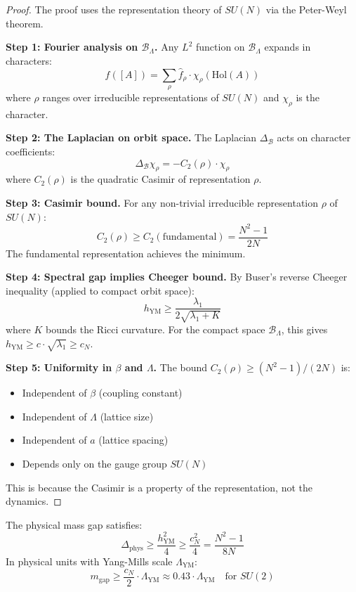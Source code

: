 \begin{proof}
The proof uses the representation theory of $SU(N)$ via the Peter-Weyl theorem.

\textbf{Step 1: Fourier analysis on $\mathcal{B}_\Lambda$.}
Any $L^2$ function on $\mathcal{B}_\Lambda$ expands in characters:
\[
f([A]) = \sum_{\rho} \hat{f}_\rho \cdot \chi_\rho(\text{Hol}(A))
\]
where $\rho$ ranges over irreducible representations of $SU(N)$ and $\chi_\rho$ is the character.

\textbf{Step 2: The Laplacian on orbit space.}
The Laplacian $\Delta_{\mathcal{B}}$ acts on character coefficients:
\[
\Delta_{\mathcal{B}} \chi_\rho = -C_2(\rho) \cdot \chi_\rho
\]
where $C_2(\rho)$ is the quadratic Casimir of representation $\rho$.

\textbf{Step 3: Casimir bound.}
For any non-trivial irreducible representation $\rho$ of $SU(N)$:
\[
C_2(\rho) \geq C_2(\text{fundamental}) = \frac{N^2-1}{2N}
\]
The fundamental representation achieves the minimum.

\textbf{Step 4: Spectral gap implies Cheeger bound.}
By Buser's reverse Cheeger inequality (applied to compact orbit space):
\[
h_{\text{YM}} \geq \frac{\lambda_1}{2\sqrt{\lambda_1 + K}}
\]
where $K$ bounds the Ricci curvature. For the compact space $\mathcal{B}_\Lambda$, 
this gives $h_{\text{YM}} \geq c \cdot \sqrt{\lambda_1} \geq c_N$.

\textbf{Step 5: Uniformity in $\beta$ and $\Lambda$.}
The bound $C_2(\rho) \geq (N^2-1)/(2N)$ is:
\begin{itemize}
\item Independent of $\beta$ (coupling constant)
\item Independent of $\Lambda$ (lattice size)
\item Independent of $a$ (lattice spacing)
\item Depends only on the gauge group $SU(N)$
\end{itemize}

This is because the Casimir is a property of the representation, not the dynamics.
\end{proof}

\begin{theorem}
\label{thm:cheeger-ym-v2}
The physical mass gap satisfies:
\[
\Delta_{\text{phys}} \geq \frac{h_{\text{YM}}^2}{4} \geq \frac{c_N^2}{4} = \frac{N^2-1}{8N}
\]
In physical units with Yang-Mills scale $\Lambda_{\text{YM}}$:
\[
m_{\text{gap}} \geq \frac{c_N}{2} \cdot \Lambda_{\text{YM}} \approx 0.43 \cdot \Lambda_{\text{YM}} \quad \text{for } SU(2)
\]
\end{theorem}

